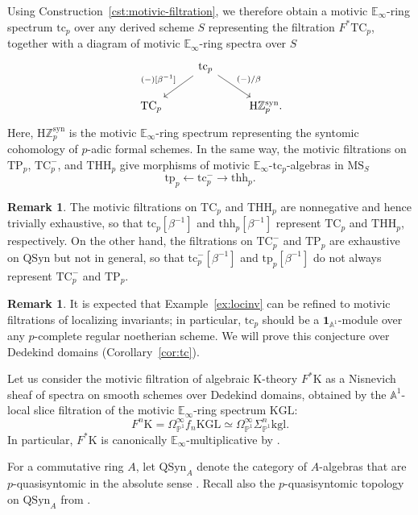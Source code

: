 \documentclass{amsart}
\numberwithin{equation}{section}
\theoremstyle{plain}
\theoremstyle{definition}
\newtheorem{remark}[equation]{Remark}
\let\bb=\mathbb
\def\Z{\bb Z}
\def\A{\bb A}
\def\P{\bb P}
\def\1{\mathbf 1}
\def\ph{\mathord-}
\def\HH{\mathrm{H}}
\def\E{\mathbb{E}}
\def\THH{\mathrm{THH}}
\def\KGL{\mathrm{KGL}}
\def\K{\mathrm{K}{}}
\def\MS{\mathrm{MS}}
\newcommand{\QSyn}{\mathrm{QSyn}}
\newcommand{\TC}{\mathrm{TC}}
\newcommand{\TP}{\mathrm{TP}}
\newcommand{\kgl}{\mathrm{kgl}}
\newcommand{\syn}{\mathrm{syn}}
\newcommand{\tc}{\mathrm{tc}}
\newcommand{\tp}{\mathrm{tp}}
\newcommand{\thh}{\mathrm{thh}}
\begin{document}
Using Construction~\ref{cst:motivic-filtration}, we therefore obtain a motivic $\E_\infty$-ring spectrum $\tc_p$ over any derived scheme $S$ representing the filtration $F^*\TC_p$, together with a diagram of motivic $\E_\infty$-ring spectra over $S$
\[
\begin{tikzcd}
	& \tc_p \ar[rd, "(\ph)/\beta"] \ar[ld, "{(\ph)[\beta^{-1}]}" swap] & \\
	\TC_p & & \HH\Z^\syn_p \rlap.
\end{tikzcd}
\]
Here, $\HH\Z^\syn_p$ is the motivic $\E_\infty$-ring spectrum representing the syntomic cohomology of $p$-adic formal schemes.
In the same way, the motivic filtrations on $\TP_p$, $\TC_p^-$, and $\THH_p$ give morphisms of motivic $\E_\infty$-$\tc_p$-algebras in $\MS_S$
\[
\tp_p\leftarrow \tc_p^- \to \thh_p.
\]

\begin{remark}
	The motivic filtrations on $\TC_p$ and $\THH_p$ are nonnegative and hence trivially exhaustive, so that $\tc_p[\beta^{-1}]$ and $\thh_p[\beta^{-1}]$ represent $\TC_p$ and $\THH_p$, respectively. On the other hand, the filtrations on $\TC_p^-$ and $\TP_p$ are exhaustive on $\QSyn$ \cite[Theorem 1.12]{BMS} but not in general, so that $\tc_p^-[\beta^{-1}]$ and $\tp_p[\beta^{-1}]$ do not always represent $\TC_p^-$ and $\TP_p$.
\end{remark}

\begin{remark}
	It is expected that Example~\ref{ex:locinv} can be refined to motivic filtrations of localizing invariants; in particular, $\tc_p$ should be a $\1_{\A^1}$-module over any $p$-complete regular noetherian scheme. 
	We will prove this conjecture over Dedekind domains (Corollary~\ref{cor:tc}).
\end{remark}

Let us consider the motivic filtration of algebraic $\K$-theory $F^*\K$ as a Nisnevich sheaf of spectra on smooth schemes over Dedekind domains, obtained by the $\A^1$-local slice filtration of the motivic $\E_\infty$-ring spectrum $\KGL$:
\[
F^n\K = \Omega^\infty_{\P^1} f_n\KGL \simeq \Omega^\infty_{\P^1} \Sigma_{\P^1}^n \kgl.
\]
In particular, $F^*\K$ is canonically $\E_\infty$-multiplicative by \cite[Section 13.4]{norms}.

For a commutative ring $A$, let $\QSyn_A$ denote the category of $A$-algebras that are $p$-quasisyntomic in the absolute sense \cite[Definition C.6]{BhattLurie}.
Recall also the $p$-quasisyntomic topology on $\QSyn_A$ from \cite[Definition C.9]{BhattLurie}.
\end{document}
